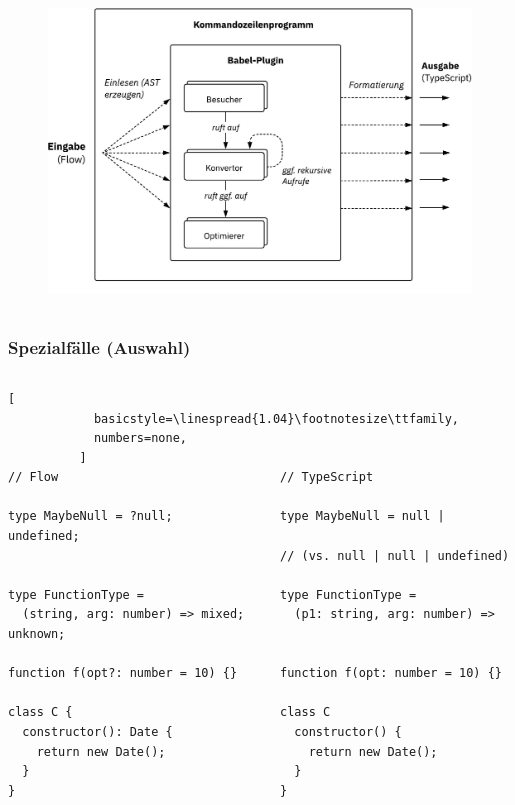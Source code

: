     \begin{frame}
      \vspace{1mm}
      \begin{columns}
        \column{\dimexpr\paperwidth-8mm}
        \begin{figure}
          \includegraphics[width=\textwidth]{src/figures/architecture-overview.pdf}
        \end{figure}
      \end{columns}
    \end{frame}

    \begin{frame}[fragile]
      \frametitle{Spezialfälle (Auswahl)}
      \begin{columns}
        \column{\dimexpr\paperwidth-11mm}
          \begin{lstlisting}[
            basicstyle=\linespread{1.04}\footnotesize\ttfamily,
            numbers=none,
          ]
// Flow                               // TypeScript

type MaybeNull = ?null;               type MaybeNull = null | undefined;
                                      // (vs. null | null | undefined)

type FunctionType =                   type FunctionType =
  (string, arg: number) => mixed;       (p1: string, arg: number) => unknown;

function f(opt?: number = 10) {}      function f(opt: number = 10) {}

class C {                             class C
  constructor(): Date {                 constructor() {
    return new Date();                    return new Date();
  }                                     }
}                                     }
        \end{lstlisting}
      \end{columns}
    \end{frame}

